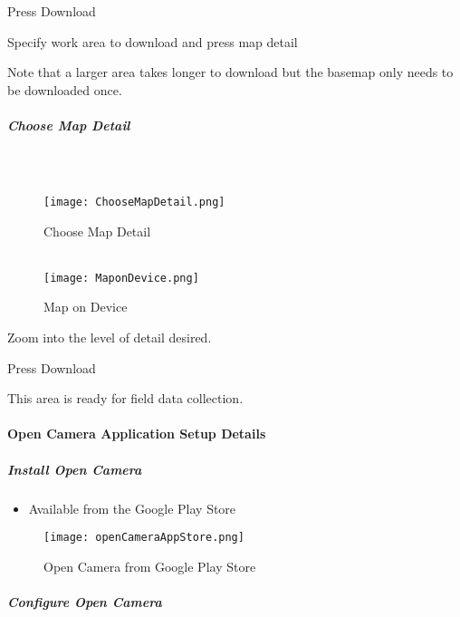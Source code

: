 \documentclass[class=article , crop=false, titlepage, twoside, multi={itemize, figure, verbatim}, float=false]{standalone}
\begin{document}
\noindent Press \Large Download\\
\vspace{3in}

\noindent Specify work area to download and press \Large map detail\\
\vspace{.5in}

\noindent \footnotesize Note that a larger area takes longer to download but the basemap only needs to be downloaded once.
\clearpage
\subparagraph{Choose Map Detail}

\subparagraph*{\\}
\begin{wrapfigure}{r}{0.5\textwidth}
\centering
\texttt{[image: ChooseMapDetail.png]}
\caption{Choose Map Detail}
\vspace{.25in}
\HRule \\[.4cm] %
\vspace{.25in}
\texttt{[image: MaponDevice.png]}
\caption{Map on Device}
\end{wrapfigure}
Zoom into the level of detail desired.
\vspace{.5in}

\noindent Press Download \\
\vspace{3.5in}

\noindent This area is ready for field data collection.

\clearpage
\paragraph{Open Camera Application Setup Details}

\subparagraph{Install Open Camera}
\begin{itemize}
\item Available from the Google Play Store
\end{itemize}
\begin{figure}[h!]
\centering
    \texttt{[image: openCameraAppStore.png]}
\caption{Open Camera from Google Play Store}
\end{figure}

\clearpage
\subparagraph{Configure Open Camera}
\end{document}
